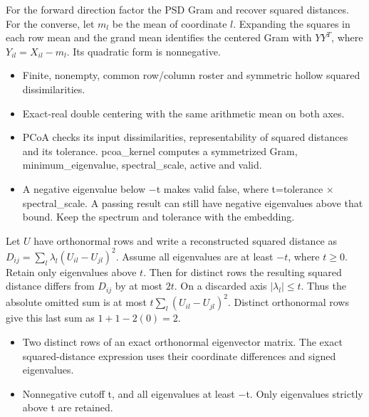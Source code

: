 \expandafter\def\csname statadic@proof@STATADIC-EMBEDDING-002\endcsname{For the forward direction factor the PSD Gram and recover squared distances.
  For the converse, let $m_l$ be the mean of coordinate $l$. Expanding the squares in
  each row mean and the grand mean identifies the centered Gram with $YY^T$, where
  $Y_{il}=X_{il}-m_l$. Its quadratic form is nonnegative.}
\expandafter\def\csname statadic@assumptions@STATADIC-EMBEDDING-002\endcsname{\begin{itemize}
\item Finite, nonempty, common row/column roster and symmetric hollow squared dissimilarities.
\item Exact-real double centering with the same arithmetic mean on both axes.
\end{itemize}}
\expandafter\def\csname statadic@diagnostics@STATADIC-EMBEDDING-002\endcsname{\begin{itemize}
\item PCoA checks its input dissimilarities, representability of squared distances and its tolerance. pcoa\_kernel computes a symmetrized Gram, minimum\_eigenvalue, spectral\_scale, active and valid.
\item A negative eigenvalue below \ensuremath{-}t makes valid false, where t=tolerance \ensuremath{\times} spectral\_scale. A passing result can still have negative eigenvalues above that bound. Keep the spectrum and tolerance with the embedding.
\end{itemize}}
\expandafter\def\csname statadic@statement@STATADIC-EMBEDDING-003\endcsname{Let $U$ have orthonormal rows and write a reconstructed squared
  distance as $D_{ij}=\sum_l \lambda_l(U_{il}-U_{jl})^2$. Assume all eigenvalues
  are at least $-t$, where $t\ge0$. Retain only eigenvalues above $t$. Then for
  distinct rows the resulting squared distance differs from $D_{ij}$ by at most $2t$.}
\expandafter\def\csname statadic@proof@STATADIC-EMBEDDING-003\endcsname{On a discarded axis $|\lambda_l|\le t$. Thus the absolute
  omitted sum is at most $t\sum_l(U_{il}-U_{jl})^2$. Distinct orthonormal rows
  give this last sum as $1+1-2(0)=2$.}
\expandafter\def\csname statadic@assumptions@STATADIC-EMBEDDING-003\endcsname{\begin{itemize}
\item Two distinct rows of an exact orthonormal eigenvector matrix. The exact squared-distance expression uses their coordinate differences and signed eigenvalues.
\item Nonnegative cutoff t, and all eigenvalues at least \ensuremath{-}t. Only eigenvalues strictly above t are retained.
\end{itemize}}

